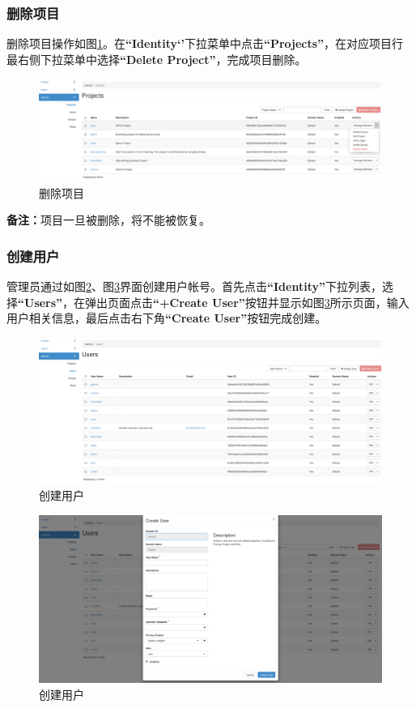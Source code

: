 \documentclass[12pt]{article}
\begin{document}
\subsubsection{删除项目}
删除项目操作如图\ref{fig:deleteProject}。在\textbf{``Identity‘’}下拉菜单中点击\textbf{``Projects''}，在对应项目行最右侧下拉菜单中选择\textbf{``Delete Project''}，完成项目删除。
\begin{figure}[!htb]
\centering
\includegraphics[width=6in]{./figures/deleteProject}
\caption{删除项目}
\label{fig:deleteProject}
\end{figure}
\textbf{备注：}项目一旦被删除，将不能被恢复。
\subsubsection{创建用户}
管理员通过如图\ref{fig:createUser}、图\ref{fig:createUser1}界面创建用户帐号。首先点击\textbf{``Identity''}下拉列表，选择\textbf{``Users''}，在弹出页面点击\textbf{``+Create User''}按钮并显示如图\ref{fig:createUser1}所示页面，输入用户相关信息，最后点击右下角\textbf{``Create User''}按钮完成创建。
\begin{figure}[!htb]
\centering
\includegraphics[width=6in]{./figures/createUser}
\caption{创建用户}
\label{fig:createUser}
\end{figure}
\begin{figure}[!htb]
\centering
\includegraphics[width=6in]{./figures/createUser1}
\caption{创建用户}
\label{fig:createUser1}
\end{figure}
\end{document}
